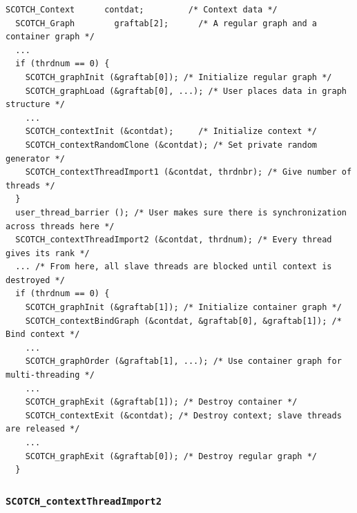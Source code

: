 \begin{lstlisting}[float,style=language-c,label={list-lib-context-import},caption={Sample
code for capturing a pool of threads and launching multi-threaded
computations using this pool. All \libscotch\ routines which are
passed the context graph (instead of the regular graph) will make use
of the captured threads.}]
  SCOTCH_Context      contdat;         /* Context data */
  SCOTCH_Graph        graftab[2];      /* A regular graph and a container graph */
  ...
  if (thrdnum == 0) {
    SCOTCH_graphInit (&graftab[0]); /* Initialize regular graph */
    SCOTCH_graphLoad (&graftab[0], ...); /* User places data in graph structure */
    ...
    SCOTCH_contextInit (&contdat);     /* Initialize context */
    SCOTCH_contextRandomClone (&contdat); /* Set private random generator */
    SCOTCH_contextThreadImport1 (&contdat, thrdnbr); /* Give number of threads */
  }
  user_thread_barrier (); /* User makes sure there is synchronization across threads here */
  SCOTCH_contextThreadImport2 (&contdat, thrdnum); /* Every thread gives its rank */
  ... /* From here, all slave threads are blocked until context is destroyed */
  if (thrdnum == 0) {
    SCOTCH_graphInit (&graftab[1]); /* Initialize container graph */
    SCOTCH_contextBindGraph (&contdat, &graftab[0], &graftab[1]); /* Bind context */
    ...
    SCOTCH_graphOrder (&graftab[1], ...); /* Use container graph for multi-threading */
    ...
    SCOTCH_graphExit (&graftab[1]); /* Destroy container */
    SCOTCH_contextExit (&contdat); /* Destroy context; slave threads are released */
    ...
    SCOTCH_graphExit (&graftab[0]); /* Destroy regular graph */
  }
\end{lstlisting}

\subsubsection{\texttt{SCOTCH\_contextThreadImport2}}

